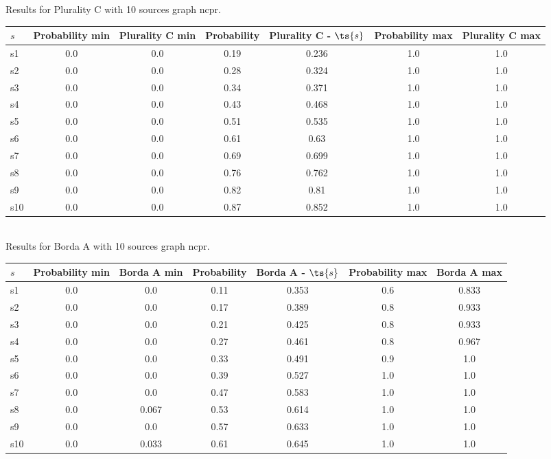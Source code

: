 \documentclass{article}
\begin{document}
\noindent Results for Plurality C with 10 sources graph ncpr.

\noindent\begin{tabular}{|l|c|c|c|c|c|c|}
\hline
$s$& Probability min & Plurality C min & Probability & Plurality C - $\ts{s}$ & Probability max & Plurality C max\\
\hline
s1 &0.0 & 0.0 & 0.19 & 0.236 & 1.0 & 1.0\\
\hline
s2 &0.0 & 0.0 & 0.28 & 0.324 & 1.0 & 1.0\\
\hline
s3 &0.0 & 0.0 & 0.34 & 0.371 & 1.0 & 1.0\\
\hline
s4 &0.0 & 0.0 & 0.43 & 0.468 & 1.0 & 1.0\\
\hline
s5 &0.0 & 0.0 & 0.51 & 0.535 & 1.0 & 1.0\\
\hline
s6 &0.0 & 0.0 & 0.61 & 0.63 & 1.0 & 1.0\\
\hline
s7 &0.0 & 0.0 & 0.69 & 0.699 & 1.0 & 1.0\\
\hline
s8 &0.0 & 0.0 & 0.76 & 0.762 & 1.0 & 1.0\\
\hline
s9 &0.0 & 0.0 & 0.82 & 0.81 & 1.0 & 1.0\\
\hline
s10 &0.0 & 0.0 & 0.87 & 0.852 & 1.0 & 1.0\\
\hline
\end{tabular}\\

\noindent Results for Borda A with 10 sources graph ncpr.

\noindent\begin{tabular}{|l|c|c|c|c|c|c|}
\hline
$s$& Probability min & Borda A min & Probability & Borda A - $\ts{s}$ & Probability max & Borda A max\\
\hline
s1 &0.0 & 0.0 & 0.11 & 0.353 & 0.6 & 0.833\\
\hline
s2 &0.0 & 0.0 & 0.17 & 0.389 & 0.8 & 0.933\\
\hline
s3 &0.0 & 0.0 & 0.21 & 0.425 & 0.8 & 0.933\\
\hline
s4 &0.0 & 0.0 & 0.27 & 0.461 & 0.8 & 0.967\\
\hline
s5 &0.0 & 0.0 & 0.33 & 0.491 & 0.9 & 1.0\\
\hline
s6 &0.0 & 0.0 & 0.39 & 0.527 & 1.0 & 1.0\\
\hline
s7 &0.0 & 0.0 & 0.47 & 0.583 & 1.0 & 1.0\\
\hline
s8 &0.0 & 0.067 & 0.53 & 0.614 & 1.0 & 1.0\\
\hline
s9 &0.0 & 0.0 & 0.57 & 0.633 & 1.0 & 1.0\\
\hline
s10 &0.0 & 0.033 & 0.61 & 0.645 & 1.0 & 1.0\\
\hline
\end{tabular}\\
\end{document}
